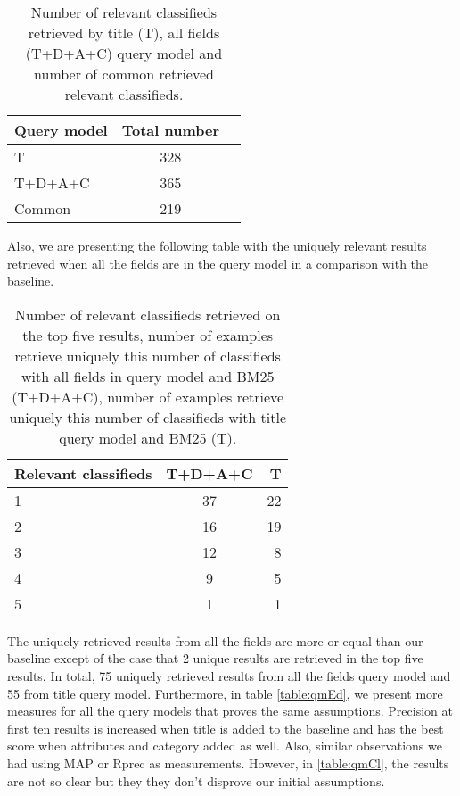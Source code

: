 \begin{table}[H]
\begin{center}
\caption{Number of relevant classifieds retrieved by title (T), all fields (T+D+A+C) query model and number of common retrieved relevant classifieds.}
\label{table:tVsEnt}
\begin{tabular}{lcr}
\midrule
 Query model &  Total number \\
\midrule
	T & 328 \\
	T+D+A+C & 365 \\
	Common & 219 \\
\bottomrule
\end{tabular}
\end{center}
\end{table}

Also, we are presenting the following table with the uniquely relevant results retrieved when all the fields are in the query model in a comparison with the baseline.


\begin{table}[H]
\begin{center}
\caption{Number of relevant classifieds retrieved on the top five results, number of examples retrieve uniquely this number of classifieds with all fields in query model and BM25 (T+D+A+C), number of examples retrieve uniquely this number of classifieds with title query model and BM25 (T).}
\begin{tabular}{lcr}
\midrule
Relevant classifieds &  T+D+A+C & T \\
\midrule
	1 & 37 & 22 \\
	2 & 16 & 19 \\
	3 & 12 & 8 \\
	4 & 9 & 5  \\
	5 & 1 & 1 \\
\bottomrule
\end{tabular}
\end{center}
\end{table}




The uniquely retrieved results from all the fields are more or equal than our baseline except of the case that 2 unique results are retrieved in the top five results. In total, 75 uniquely retrieved results from all the fields query model and 55 from title query model. Furthermore, in table \ref{table:qmEd}, we present more measures for all the query models that proves the same assumptions. Precision at first ten results is increased when title is added to the baseline and has the best score when attributes and category added as well. Also, similar observations we had using MAP or Rprec as measurements. However, in \ref{table:qmCl}, the results are not so clear but they they don't disprove our initial assumptions.

